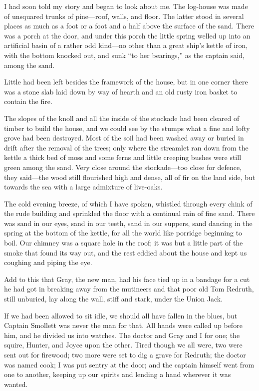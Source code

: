 I had soon told my story and began to look about me. The log-house was made of unsquared trunks of pine---roof, walls, and floor. The latter stood in several places as much as a foot or a foot and a half above the surface of the sand. There was a porch at the door, and under this porch the little spring welled up into an artificial basin of a rather odd kind---no other than a great ship’s kettle of iron, with the bottom knocked out, and sunk \enquote{to her bearings,} as the captain said, among the sand.

Little had been left besides the framework of the house, but in one corner there was a stone slab laid down by way of hearth and an old rusty iron basket to contain the fire.

The slopes of the knoll and all the inside of the stockade had been cleared of timber to build the house, and we could see by the stumps what a fine and lofty grove had been destroyed. Most of the soil had been washed away or buried in drift after the removal of the trees; only where the streamlet ran down from the kettle a thick bed of moss and some ferns and little creeping bushes were still green among the sand. Very close around the stockade---too close for defence, they said---the wood still flourished high and dense, all of fir on the land side, but towards the sea with a large admixture of live-oaks.

The cold evening breeze, of which I have spoken, whistled through every chink of the rude building and sprinkled the floor with a continual rain of fine sand. There was sand in our eyes, sand in our teeth, sand in our suppers, sand dancing in the spring at the bottom of the kettle, for all the world like porridge beginning to boil. Our chimney was a square hole in the roof; it was but a little part of the smoke that found its way out, and the rest eddied about the house and kept us coughing and piping the eye.

Add to this that Gray, the new man, had his face tied up in a bandage for a cut he had got in breaking away from the mutineers and that poor old Tom Redruth, still unburied, lay along the wall, stiff and stark, under the Union Jack.

If we had been allowed to sit idle, we should all have fallen in the blues, but Captain Smollett was never the man for that. All hands were called up before him, and he divided us into watches. The doctor and Gray and I for one; the squire, Hunter, and Joyce upon the other. Tired though we all were, two were sent out for firewood; two more were set to dig a grave for Redruth; the doctor was named cook; I was put sentry at the door; and the captain himself went from one to another, keeping up our spirits and lending a hand wherever it was wanted.

